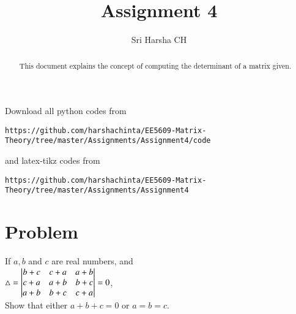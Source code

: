 \documentclass[journal,12pt,twocolumn]{IEEEtran}
\begin{document}
\renewcommand{\thefigure}{\theproblem}

\def\putbox#1#2#3{\makebox[0in][l]{\makebox[#1][l]{}\raisebox{\baselineskip}[0in][0in]{\raisebox{#2}[0in][0in]{#3}}}}
     \def\rightbox#1{\makebox[0in][r]{#1}}
     \def\centbox#1{\makebox[0in]{#1}}
     \def\topbox#1{\raisebox{-\baselineskip}[0in][0in]{#1}}
     \def\midbox#1{\raisebox{-0.5\baselineskip}[0in][0in]{#1}}
\vspace{3cm}
\title{Assignment 4}
\author{Sri Harsha CH}

\maketitle
\newpage

\bigskip
\renewcommand{\thefigure}{\theenumi}
\renewcommand{\thetable}{\theenumi}

\begin{abstract}
This document explains the concept of computing the determinant of a matrix given.
\end{abstract}

Download all python codes from 
\begin{lstlisting}
https://github.com/harshachinta/EE5609-Matrix-Theory/tree/master/Assignments/Assignment4/code
\end{lstlisting}
%
and latex-tikz codes from 
%
\begin{lstlisting}
https://github.com/harshachinta/EE5609-Matrix-Theory/tree/master/Assignments/Assignment4
\end{lstlisting}
%
\section{Problem}
If $a,b$ and $c$ are real numbers, and\\
$\triangle = \begin{vmatrix}b+c & c+a & a+b\\c+a & a+b & b+c\\a+b&b+c & c+a\end{vmatrix} =0$, \\Show that either $a+b+c =0$ or $a=b=c$.
\end{document}
